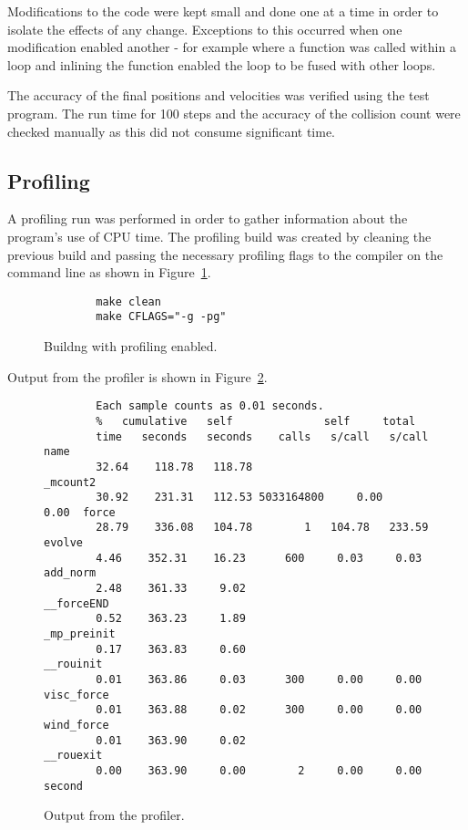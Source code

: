 \documentclass[11pt, oneside]{article}   %
\begin{document}
Modifications to the code were kept small and done one at a time in order to isolate the effects of any change.
Exceptions to this occurred when one modification enabled another - for example where a function was called within a loop and inlining the function enabled the loop to be fused with other loops.

The accuracy of the final positions and velocities was verified using the test program.
The run time for 100 steps and the accuracy of the collision count were checked manually as this did not consume significant time.

\subsection{Profiling}

A profiling run was performed in order to gather information about the program's use of CPU time.
The profiling build was created by cleaning the previous build and passing the necessary profiling flags to the compiler on the command line as shown in Figure~\ref{figure:ProfMake}.

\begin{figure}
	\begin{lstlisting}
		make clean
		make CFLAGS="-g -pg"
	\end{lstlisting}
	\caption{Buildng with profiling enabled.}
	\label{figure:ProfMake}
\end{figure}

Output from the profiler is shown in Figure~\ref{figure:ProfOutput}.
\begin{figure}
	\begin{lstlisting}
		Each sample counts as 0.01 seconds.
		%   cumulative   self              self     total           
		time   seconds   seconds    calls   s/call   s/call  name    
		32.64    118.78   118.78                             _mcount2
		30.92    231.31   112.53 5033164800     0.00     0.00  force
		28.79    336.08   104.78        1   104.78   233.59  evolve
		4.46    352.31    16.23      600     0.03     0.03  add_norm
		2.48    361.33     9.02                             __forceEND
		0.52    363.23     1.89                             _mp_preinit
		0.17    363.83     0.60                             __rouinit
		0.01    363.86     0.03      300     0.00     0.00  visc_force
		0.01    363.88     0.02      300     0.00     0.00  wind_force
		0.01    363.90     0.02                             __rouexit
		0.00    363.90     0.00        2     0.00     0.00  second
	\end{lstlisting}
	\caption{Output from the profiler.}
	\label{figure:ProfOutput}
\end{figure}
\end{document}
